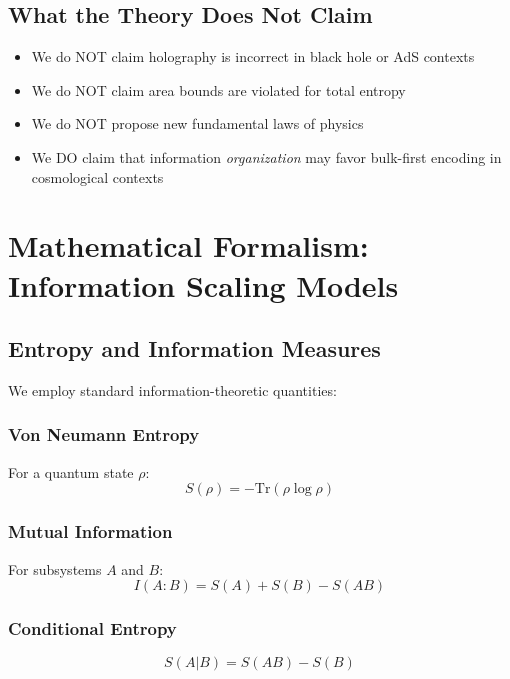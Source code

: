 \documentclass[twocolumn,aps,prd,superscriptaddress,nofootinbib]{revtex4-2}
\begin{document}
\subsection{What the Theory Does Not Claim}

\begin{itemize}
    \item We do NOT claim holography is incorrect in black hole or AdS contexts
    \item We do NOT claim area bounds are violated for total entropy
    \item We do NOT propose new fundamental laws of physics
    \item We DO claim that information \textit{organization} may favor bulk-first encoding in cosmological contexts
\end{itemize}

\section{Mathematical Formalism: Information Scaling Models}

\subsection{Entropy and Information Measures}

We employ standard information-theoretic quantities:

\subsubsection{Von Neumann Entropy}
For a quantum state $\rho$:
\begin{equation}
S(\rho) = -\text{Tr}(\rho \log \rho)
\end{equation}

\subsubsection{Mutual Information}
For subsystems $A$ and $B$:
\begin{equation}
I(A:B) = S(A) + S(B) - S(AB)
\end{equation}

\subsubsection{Conditional Entropy}
\begin{equation}
S(A|B) = S(AB) - S(B)
\end{equation}
\end{document}
